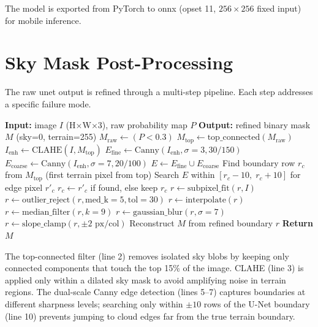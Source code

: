 The model is exported from PyTorch to \Gls{onnx} (opset 11, $256 \times 256$ fixed input) for mobile inference.

\section{Sky Mask Post-Processing}

The raw \Gls{unet} output is refined through a multi-step pipeline. Each step addresses a specific failure mode.

\begin{algorithm}[H]
\caption{Sky Mask Post-Processing}
\label{alg:postprocess}
\begin{algorithmic}[1]
\State \textbf{Input:} image $I$ (H$\times$W$\times$3), raw probability map $P$
\State \textbf{Output:} refined binary mask $M$ (sky=0, terrain=255)
\State $M_{\text{raw}} \leftarrow (P < 0.3)$ 
\State $M_{\text{top}} \leftarrow \text{top\_connected}(M_{\text{raw}})$ 
\State $I_{\text{enh}} \leftarrow \text{CLAHE}(I, M_{\text{top}})$ 
\State $E_{\text{fine}} \leftarrow \text{Canny}(I_{\text{enh}}, \sigma=3, 30/150)$
\State $E_{\text{coarse}} \leftarrow \text{Canny}(I_{\text{enh}}, \sigma=7, 20/100)$
\State $E \leftarrow E_{\text{fine}} \cup E_{\text{coarse}}$
    \State Find boundary row $r_c$ from $M_{\text{top}}$ (first terrain pixel from top)
    \State Search $E$ within $[r_c - 10,\; r_c + 10]$ for edge pixel $r'_c$
    \State $r_c \leftarrow r'_c$ if found, else keep $r_c$
\EndFor
\State $r \leftarrow \text{subpixel\_fit}(r, I)$ 
\State $r \leftarrow \text{outlier\_reject}(r, \text{med\_k}=5, \text{tol}=30)$
\State $r \leftarrow \text{interpolate}(r)$ 
\State $r \leftarrow \text{median\_filter}(r, k=9)$
\State $r \leftarrow \text{gaussian\_blur}(r, \sigma=7)$
\State $r \leftarrow \text{slope\_clamp}(r, \pm 2\text{ px/col})$ 
\State Reconstruct $M$ from refined boundary $r$
\State \textbf{Return} $M$
\end{algorithmic}
\end{algorithm}

\noindent The top-connected filter (line 2) removes isolated sky blobs by keeping only connected components that touch the top 15\% of the image. CLAHE (line 3) is applied only within a dilated sky mask to avoid amplifying noise in terrain regions. The dual-scale Canny edge detection (lines 5--7) captures boundaries at different sharpness levels; searching only within $\pm 10$ rows of the U-Net boundary (line 10) prevents jumping to cloud edges far from the true terrain boundary.

